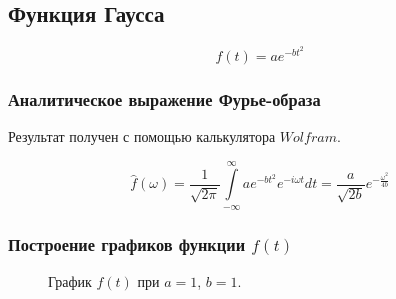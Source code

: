 \documentclass[a5paper, 10pt]{article}
\theoremstyle{definition}
\theoremstyle{plain}
\theoremstyle{remark}
\begin{document}
\newpage
\subsection{Функция Гаусса}

\begin{equation}
f(t) = a e^{-bt^2}
\end{equation}


\subsubsection{Аналитическое выражение Фурье-образа}

Результат получен с помощью калькулятора $Wolfram$.

\begin{equation}
\hat{f}(\omega) =
 \frac{1}{\sqrt{2 \pi}} \int \limits_{-\infty}^{\infty}  a e^{-bt^2} e^{-i \omega t} dt = \frac{a}{\sqrt{2b}} e^{-\frac{\omega^2}{4b}}
\end{equation}

\subsubsection{Построение графиков функции $f(t)$}

\begin{figure}[h!]
\caption{График $f(t)$ при $a = 1$, $b = 1$.}
\end{figure}
\end{document}
